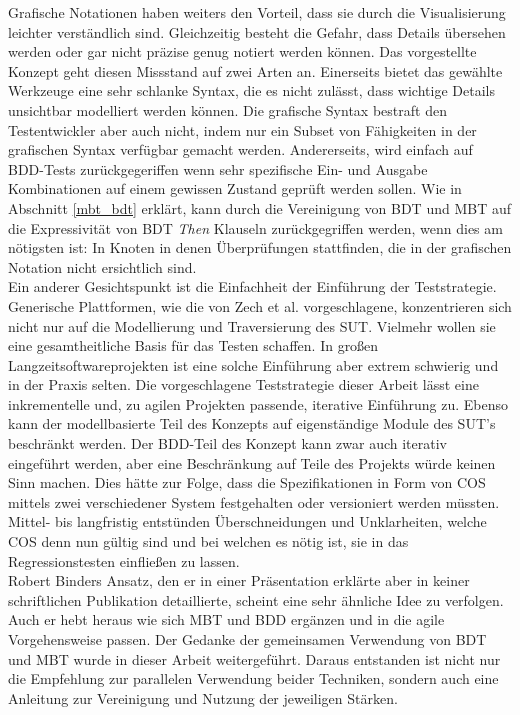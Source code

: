 Grafische Notationen haben weiters den Vorteil, dass sie durch die Visualisierung leichter verständlich sind. Gleichzeitig besteht die Gefahr, dass Details übersehen werden oder gar nicht präzise genug notiert werden können. Das vorgestellte Konzept geht diesen Missstand auf zwei Arten an. Einerseits bietet das gewählte Werkzeuge eine sehr schlanke Syntax, die es nicht zulässt, dass wichtige Details unsichtbar modelliert werden können. Die grafische Syntax bestraft den Testentwickler aber auch nicht, indem nur ein Subset von Fähigkeiten in der grafischen Syntax verfügbar gemacht werden. Andererseits, wird einfach auf BDD-Tests zurückgegeriffen wenn sehr spezifische Ein- und Ausgabe Kombinationen auf einem gewissen Zustand geprüft werden sollen. Wie in Abschnitt \ref{mbt_bdt} erklärt, kann durch die Vereinigung von \Gls{BDT} und \Gls{MBT} auf die Expressivität von \Gls{BDT} \textit{Then} Klauseln zurückgegriffen werden, wenn dies am nötigsten ist: In Knoten in denen Überprüfungen stattfinden, die in der grafischen Notation nicht ersichtlich sind.\\
Ein anderer Gesichtspunkt ist die Einfachheit der Einführung der Teststrategie. Generische Plattformen, wie die von Zech et al. \cite{zech_generic_2012} vorgeschlagene, konzentrieren sich nicht nur auf die Modellierung und Traversierung des \Gls{SUT}. Vielmehr wollen sie eine gesamtheitliche Basis für das Testen schaffen. In großen Langzeitsoftwareprojekten ist eine solche Einführung aber extrem schwierig und in der Praxis selten. Die vorgeschlagene Teststrategie dieser Arbeit lässt eine inkrementelle und, zu agilen Projekten passende, iterative Einführung zu. Ebenso kann der modellbasierte Teil des Konzepts auf eigenständige Module des SUT's beschränkt werden. Der BDD-Teil des Konzept kann zwar auch iterativ eingeführt werden, aber eine Beschränkung auf Teile des Projekts würde keinen Sinn machen. Dies hätte zur Folge, dass die Spezifikationen in Form von \Gls{COS} mittels zwei verschiedener System festgehalten oder versioniert werden müssten. Mittel- bis langfristig entstünden Überschneidungen und Unklarheiten, welche \Gls{COS} denn nun gültig sind und bei welchen es nötig ist, sie in das Regressionstesten einfließen zu lassen.\\
Robert Binders Ansatz, den er in einer Präsentation \cite{binder_model-based_2014} erklärte aber in keiner schriftlichen Publikation detaillierte, scheint eine sehr ähnliche Idee zu verfolgen. Auch er hebt heraus wie sich \Gls{MBT} und \Gls{BDD} ergänzen und in die agile Vorgehensweise passen. Der Gedanke der gemeinsamen Verwendung von \Gls{BDT} und \Gls{MBT} wurde in dieser Arbeit weitergeführt. Daraus entstanden ist nicht nur die Empfehlung zur parallelen Verwendung beider Techniken, sondern auch eine Anleitung zur Vereinigung und Nutzung der jeweiligen Stärken.


